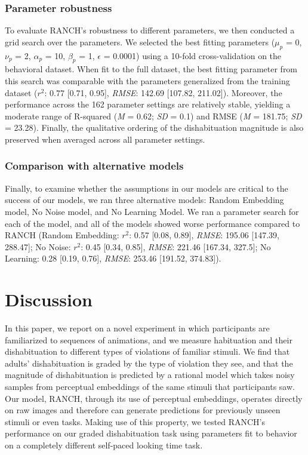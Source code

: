 \documentclass[10pt, letterpaper]{article}
\begin{document}
\hypertarget{parameter-robustness}{%
\subsubsection{Parameter robustness}\label{parameter-robustness}}

To evaluate RANCH's robustness to different parameters, we then
conducted a grid search over the parameters. We selected the best
fitting parameters (\(\mu_{p}\) = 0,\(\nu_{p}\) = 2, \(\alpha_{p}\) =
10, \(\beta_{p}\) = 1, \(\epsilon\) = 0.0001) using a 10-fold
cross-validation on the behavioral dataset. When fit to the full
dataset, the best fitting parameter from this search was comparable with
the parameters generalized from the training dataset (\(r^2\): 0.77
{[}0.71, 0.95{]}, \emph{RMSE}: 142.69 {[}107.82, 211.02{]}). Moreover,
the performance across the 162 parameter settings are relatively stable,
yielding a moderate range of R-squared (\emph{M} = 0.62; \emph{SD} =
0.1) and RMSE (\emph{M} = 181.75; \emph{SD} = 23.28). Finally, the
qualitative ordering of the dishabituation magnitude is also preserved
when averaged across all parameter settings.

\hypertarget{comparison-with-alternative-models}{%
\subsubsection{Comparison with alternative
models}\label{comparison-with-alternative-models}}

Finally, to examine whether the assumptions in our models are critical
to the success of our models, we ran three alternative models: Random
Embedding model, No Noise model, and No Learning Model. We ran a
parameter search for each of the model, and all of the models showed
worse performance compared to RANCH (Random Embedding: \(r^2\): 0.57
{[}0.08, 0.89{]}, \emph{RMSE}: 195.06 {[}147.39, 288.47{]}; No Noise:
\(r^2\): 0.45 {[}0.34, 0.85{]}, \emph{RMSE}: 221.46 {[}167.34, 327.5{]};
No Learning: 0.28 {[}0.19, 0.76{]}, \emph{RMSE}: 253.46 {[}191.52,
374.83{]}).

\hypertarget{discussion}{%
\section{Discussion}\label{discussion}}

In this paper, we report on a novel experiment in which participants are
familiarized to sequences of animations, and we measure habituation and
their dishabituation to different types of violations of familiar
stimuli. We find that adults' dishabituation is graded by the type of
violation they see, and that the magnitude of dishabituation is
predicted by a rational model which takes noisy samples from perceptual
embeddings of the same stimuli that participants saw. Our model, RANCH,
through its use of perceptual embeddings, operates directly on raw
images and therefore can generate predictions for previously unseen
stimuli or even tasks. Making use of this property, we tested RANCH's
performance on our graded dishabituation task using parameters fit to
behavior on a completely different self-paced looking time task.
\end{document}
